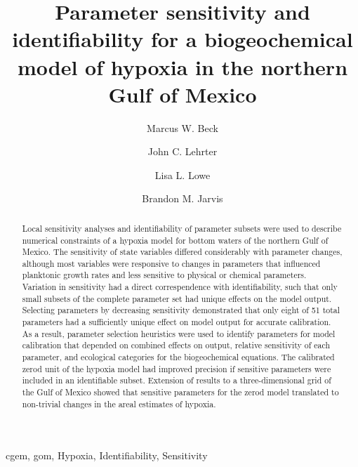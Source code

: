 \documentclass[preprint]{elsarticle}\usepackage[]{graphicx}\usepackage[]{color}
\begin{document}
\begin{frontmatter}

\title{Parameter sensitivity and identifiability for a biogeochemical model of hypoxia in the northern {G}ulf of {M}exico}

\date{}

\author{Marcus W. Beck}
\address{USEPA National Health and Environmental Effects Research Laboratory, Gulf Ecology Division, 1 Sabine Island Drive, Gulf Breeze, FL 32561}

\author{John C. Lehrter}
\address{Dauphin Island Sea Lab, University of South Alabama, Dauphin Island, AL 36528}

\author{Lisa L. Lowe}
\address{Lockheed Martin IS \& GS - Civil supporting the USEPA, Research Triangle Park, NC 27709}

\author{Brandon M. Jarvis}
\address{USEPA National Health and Environmental Effects Research Laboratory, Gulf Ecology Division, 1 Sabine Island Drive, Gulf Breeze, FL 32561}



\begin{abstract}
\noindent Local sensitivity analyses and identifiability of parameter subsets were used to describe numerical constraints of a hypoxia model for bottom waters of the northern Gulf of Mexico.  The sensitivity of state variables differed considerably with parameter changes, although most variables were responsive to changes in parameters that influenced planktonic growth rates and less sensitive to physical or chemical parameters.  Variation in sensitivity had a direct correspendence with identifiability, such that only small subsets of the complete parameter set had unique effects on the model output. Selecting parameters by decreasing sensitivity demonstrated that only eight of 51 total parameters had a sufficiently unique effect on model output for accurate calibration.  As a result, parameter selection heuristics were used to identify parameters for model calibration that depended on combined effects on output, relative sensitivity of each parameter, and ecological categories for the biogeochemical equations. The calibrated \ac{zerod} unit of the hypoxia model had improved precision if sensitive parameters were included in an identifiable subset.  Extension of results to a three-dimensional grid of the Gulf of Mexico showed that sensitive parameters for the \ac{zerod} model translated to non-trivial changes in the areal estimates of hypoxia.
\end{abstract}

\begin{keyword}
\ac{cgem}, \ac{gom}, Hypoxia, Identifiability, Sensitivity
\end{keyword}

\end{frontmatter}
\end{document}
